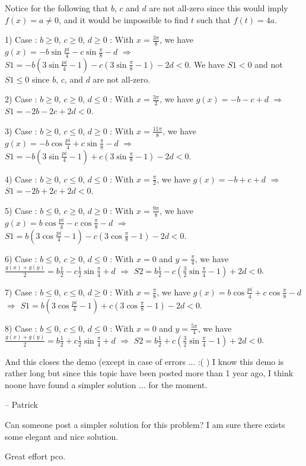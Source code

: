 \begin{mysolution}
Notice for the following that $b$, $c$ and $d$ are not all-zero since this would imply $f(x)=a\neq 0$, and it would be impossible to find $t$ such that $f(t)=4a$.

1) Case : $b\geq 0$, $c\geq 0$, $d\geq 0$ :
With $x=\frac{3\pi}{8}$, we have $g(x)=-b\sin{\frac{pi}{4}}-c\sin{\frac{\pi}{8}}-d$ $\Rightarrow $ $S1=-b(3\sin{\frac{pi}{4}}-1)-c(3\sin{\frac{\pi}{8}}-1)-2d < 0$.
We have $S1<0$ and not $S1\leq 0$ since $b$, $c$, and $d$ are not all-zero.

2) Case : $b\geq 0$, $c\geq 0$, $d\leq 0$ :
With $x=\frac{3\pi}{2}$, we have $g(x)=-b-c+d$ $\Rightarrow $ $S1=-2b-2c+2d< 0$.

3) Case : $b\geq 0$, $c\leq 0$, $d\geq 0$ :
With $x=\frac{11\pi}{8}$, we have $g(x)=-b\cos{\frac{pi}{4}}+c\sin{\frac{\pi}{8}}-d$ $\Rightarrow $ $S1=-b(3\sin{\frac{pi}{4}}-1)+c(3\sin{\frac{\pi}{8}}-1)-2d < 0$.

4) Case : $b\geq 0$, $c\leq 0$, $d\leq 0$ :
With $x=\frac{\pi}{2}$, we have $g(x)=-b+c+d$ $\Rightarrow $ $S1=-2b+2c+2d< 0$.

5) Case : $b\leq 0$, $c\geq 0$, $d\geq 0$ :
With $x=\frac{9\pi}{8}$, we have $g(x)=b\cos{\frac{pi}{4}}-c\cos{\frac{\pi}{8}}-d$ $\Rightarrow $ $S1=b(3\cos{\frac{pi}{4}}-1)-c(3\cos{\frac{\pi}{8}}-1)-2d < 0$.

6) Case : $b\leq 0$, $c\geq 0$, $d\leq 0$ :
With $x=0$ and $y=\frac{\pi}{4}$, we have $\frac{g(x)+g(y)}{2}=b\frac{1}{2}-c\frac{1}{2}\sin{\frac{\pi}{4}}+d$ $\Rightarrow $ $S2=b\frac{1}{2}-c(\frac{3}{2}\sin{\frac{\pi}{4}}-1)+2d < 0$.

7) Case : $b\leq 0$, $c\leq 0$, $d\geq 0$ :
With $x=\frac{\pi}{8}$, we have $g(x)=b\cos{\frac{pi}{4}}+c\cos{\frac{\pi}{8}}-d$ $\Rightarrow $ $S1=b(3\cos{\frac{pi}{4}}-1)+c(3\cos{\frac{\pi}{8}}-1)-2d < 0$.

8) Case : $b\leq 0$, $c\leq 0$, $d\leq 0$ :
With $x=0$ and $y=\frac{5\pi}{4}$, we have $\frac{g(x)+g(y)}{2}=b\frac{1}{2}+c\frac{1}{2}\sin{\frac{\pi}{4}}+d$ $\Rightarrow $ $S2=b\frac{1}{2}+c(\frac{3}{2}\sin{\frac{\pi}{4}}-1)+2d < 0$.


And this closes the demo (except in case of errors ... :(  )
I know this demo is rather long but since this topic have been posted more than 1 year ago, I think noone have found a simpler solution ... for the moment.

-- 
Patrick
\end{mysolution}



\begin{mysolution}
	Can someone post a simpler solution for this problem?
I am sure there exists some elegant and nice solution.

Great effort pco.
\end{mysolution}



